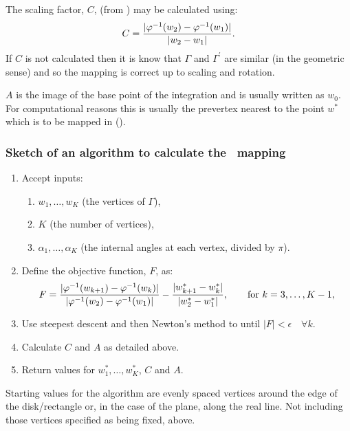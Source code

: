 The scaling factor, $C$, (from ) may be calculated using:
\begin{equation}
C=\frac{\vert \varphi^{-1}(w_2)-\varphi^{-1}(w_1)\vert}{\vert w_2 - w_1\vert}.
\end{equation}
If $C$ is not calculated then it is know that $\Gamma$ and $\Gamma^\prime$ are similar (in the geometric sense) and so the mapping is correct up to scaling and rotation. 

$A$ is the image of the base point of the integration and is usually written as $w_0$. For computational reasons this is usually the prevertex nearest to the point $w^*$ which is to be mapped in   (\cite[p. 27]{driscoll}).


\subsubsection{Sketch of an algorithm to calculate the \sch\ mapping}
\label{algorithmsketch}
\begin{enumerate}
\item Accept inputs:
   \begin{enumerate} 
      \item $w_1,\dots,w_K$ (the vertices of $\Gamma$),
      \item $K$ (the number of vertices),
      \item $\alpha_1,\dots,\alpha_K$ (the internal angles at each vertex, divided by $\pi$).
   \end{enumerate}
\item Define the objective function, $F$, as:
 \begin{equation*}
F=\frac{\vert \varphi^{-1}(w_{k+1}) -  \varphi^{-1}(w_k) \vert}{\vert \varphi^{-1}(w_2)-\varphi^{-1}(w_1)\vert} - \frac{\vert w^*_{k+1} - w^*_k\vert}{\vert w^*_2 - w^*_1\vert}, \qquad \text{for } k=3,\dots,K-1,
 \end{equation*}
\item Use steepest descent and then Newton's method to until $\vert F\vert < \epsilon \quad \forall k$. \item Calculate $C$ and $A$ as detailed above.
\item Return values for $w^*_1,\dots,w^*_K$, $C$ and $A$.
\end{enumerate}

Starting values for the algorithm are evenly spaced vertices around the edge of the disk/rectangle or, in the case of the plane, along the real line. Not including those vertices specified as being fixed, above.

